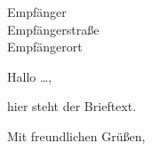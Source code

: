 \documentclass[fontsize=11pt, ngerman]{scrlttr2}
\author{Autorname} %
\begin{document}

 \begin{letter}{Empfänger\\
Empfängerstraße\\
Empfängerort}




\opening{Hallo \dots,}

hier steht der Brieftext.

\closing{Mit freundlichen Grüßen,}




 \end{letter}
\end{document}

